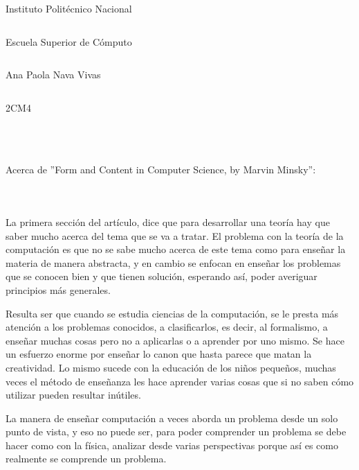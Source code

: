 \documentclass[addressstd,a4paper,20pt]{dinbrief}
\begin{document}
\Large


Instituto Polit\'ecnico Nacional
\begin{lstlisting}
\end{lstlisting}
Escuela Superior de C\'omputo
\begin{lstlisting}
\end{lstlisting}
Ana Paola Nava Vivas
\begin{lstlisting}
\end{lstlisting}
2CM4

\begin{lstlisting}
\end{lstlisting}
\begin{lstlisting}
\end{lstlisting}
\begin{lstlisting}
\end{lstlisting}
\begin{lstlisting}
\end{lstlisting}
Acerca de ''Form and Content in Computer Science, by Marvin Minsky'':
\begin{lstlisting}
\end{lstlisting}
\begin{lstlisting}
\end{lstlisting}
\begin{lstlisting}
\end{lstlisting}

La primera secci\'on del art\'iculo, dice que para desarrollar una teor\'ia hay que saber mucho acerca del tema que se va a tratar. El problema con la teor\'ia de la computaci\'on es que no se sabe mucho acerca de este tema como para ense\~nar la materia de manera abstracta, y en cambio se enfocan en ense\~nar los problemas que se conocen bien y que tienen soluci\'on, esperando as\'i, poder averiguar principios m\'as generales.

Resulta ser que cuando se estudia ciencias de la computaci\'on, se le presta m\'as atenci\'on a los problemas conocidos, a clasificarlos, es decir, al formalismo, a ense\~nar muchas cosas pero no a aplicarlas o a aprender por uno mismo. Se hace un esfuerzo enorme por ense\~nar lo canon que hasta parece que matan la creatividad. Lo mismo sucede con la educaci\'on de los ni\~nos peque\~nos, muchas veces el m\'etodo de ense\~nanza les hace aprender varias cosas que si no saben c\'omo utilizar pueden resultar in\'utiles.

La manera de ense\~nar computaci\'on a veces aborda un problema desde un solo punto de vista, y eso no puede ser, para poder comprender un problema se debe hacer como con la f\'isica, analizar desde varias perspectivas porque as\'i es como realmente se comprende un problema.
\end{document}
